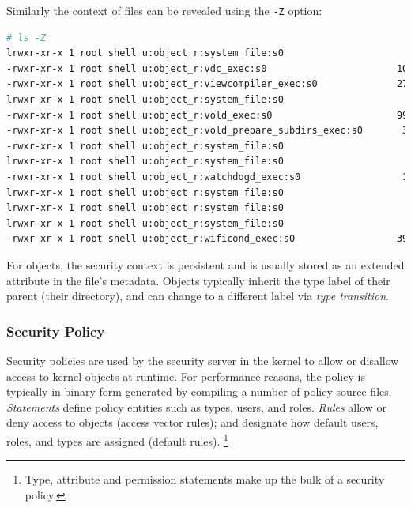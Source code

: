 Similarly the context of files can be revealed using the \texttt{-Z} option:
\begin{lstlisting}[language=sh]
# ls -Z
lrwxr-xr-x 1 root shell u:object_r:system_file:s0                         6 2023-11-19 00:50 uuidgen -> toybox
-rwxr-xr-x 1 root shell u:object_r:vdc_exec:s0                       101920 2023-11-19 00:50 vdc
-rwxr-xr-x 1 root shell u:object_r:viewcompiler_exec:s0              277472 2023-11-19 00:50 viewcompiler
lrwxr-xr-x 1 root shell u:object_r:system_file:s0                         6 2023-11-19 00:50 vmstat -> toybox
-rwxr-xr-x 1 root shell u:object_r:vold_exec:s0                      994368 2023-11-19 00:50 vold
-rwxr-xr-x 1 root shell u:object_r:vold_prepare_subdirs_exec:s0       38576 2023-11-19 00:50 vold_prepare_subdirs
-rwxr-xr-x 1 root shell u:object_r:system_file:s0                       169 2023-11-19 01:02 vr
lrwxr-xr-x 1 root shell u:object_r:system_file:s0                         6 2023-11-19 00:50 watch -> toybox
-rwxr-xr-x 1 root shell u:object_r:watchdogd_exec:s0                  10760 2023-11-19 00:50 watchdogd
lrwxr-xr-x 1 root shell u:object_r:system_file:s0                         6 2023-11-19 00:50 wc -> toybox
lrwxr-xr-x 1 root shell u:object_r:system_file:s0                         6 2023-11-19 00:50 which -> toybox
lrwxr-xr-x 1 root shell u:object_r:system_file:s0                         6 2023-11-19 00:50 whoami -> toybox
-rwxr-xr-x 1 root shell u:object_r:wificond_exec:s0                  393248 2023-11-19 00:50 wificond

\end{lstlisting}
For objects, the security context is persistent and is usually stored as an extended attribute in the file's metadata. Objects typically inherit the type label of their parent (their directory), and can change to a different label via \textit{type transition}.

\subsubsection{Security Policy}

Security policies are used by the security server in the kernel to allow or disallow access to kernel objects at runtime. For performance reasons, the policy is typically in binary form generated by compiling a number of policy source files. \textit{Statements} define policy entities such as types, users, and roles. \textit{Rules} allow or deny access to objects (access vector rules); and designate how default users, roles, and types are assigned (default rules). \footnote{Type, attribute and permission statements make up the bulk of a security policy.}

